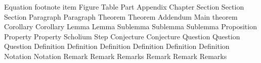   
\let\fullref\autoref
%
%
%
\def\makeautorefname#1#2{\expandafter\def\csname#1autorefname\endcsname{#2}}
%
%  
\makeautorefname{equation}{Equation}%
\makeautorefname{footnote}{footnote}%
\makeautorefname{item}{item}%
\makeautorefname{figure}{Figure}%
\makeautorefname{table}{Table}%
\makeautorefname{part}{Part}%
\makeautorefname{appendix}{Appendix}%
\makeautorefname{chapter}{Chapter}%
\makeautorefname{section}{Section}%
\makeautorefname{subsection}{Section}%
\makeautorefname{subsubsection}{Section}%
\makeautorefname{paragraph}{Paragraph}%
\makeautorefname{subparagraph}{Paragraph}%
\makeautorefname{theorem}{Theorem}%
\makeautorefname{thm}{Theorem}%
\makeautorefname{addm}{Addendum}%
\makeautorefname{mainthm}{Main theorem}%
\makeautorefname{corollary}{Corollary}%
\makeautorefname{cor}{Corollary}%
\makeautorefname{lemma}{Lemma}%
\makeautorefname{lem}{Lemma}%
\makeautorefname{sublemma}{Sublemma}%
\makeautorefname{sublem}{Sublemma}%
\makeautorefname{subl}{Sublemma}%
\makeautorefname{prop}{Proposition}%
\makeautorefname{property}{Property}
\makeautorefname{pro}{Property}
\makeautorefname{sch}{Scholium}%
\makeautorefname{step}{Step}%
\makeautorefname{conject}{Conjecture}%
\makeautorefname{conjecture}{Conjecture}%
\makeautorefname{questn}{Question}
\makeautorefname{quest}{Question}
\makeautorefname{qn}{Question}
\makeautorefname{definition}{Definition}%
\makeautorefname{defn}{Definition}%
\makeautorefname{defi}{Definition}%
\makeautorefname{def}{Definition}%
\makeautorefname{dfn}{Definition}%
\makeautorefname{df}{Definition}%
\makeautorefname{notation}{Notation}
\makeautorefname{notn}{Notation}
\makeautorefname{rem}{Remark}%
\makeautorefname{remark}{Remark}%
\makeautorefname{rems}{Remarks}%
\makeautorefname{rmk}{Remark}%
\makeautorefname{rk}{Remark}%
\makeautorefname{remarks}{Remarks}%
